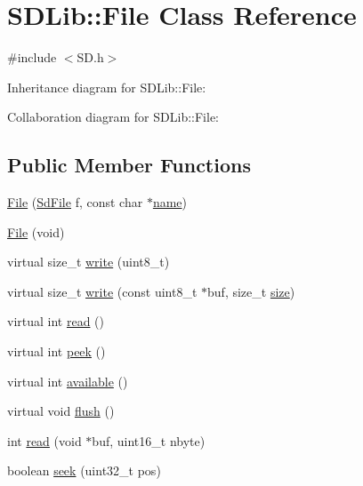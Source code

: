 \hypertarget{class_s_d_lib_1_1_file}{}\section{S\+D\+Lib\+:\+:File Class Reference}
\label{class_s_d_lib_1_1_file}


{\ttfamily \#include $<$S\+D.\+h$>$}



Inheritance diagram for S\+D\+Lib\+:\+:File\+:


Collaboration diagram for S\+D\+Lib\+:\+:File\+:
\subsection*{Public Member Functions}
\begin{DoxyCompactItemize}
\item 
\hyperlink{class_s_d_lib_1_1_file_ad34490d697d9e56859f566534b360c54}{File} (\hyperlink{class_sd_file}{Sd\+File} f, const char $\ast$\hyperlink{class_s_d_lib_1_1_file_a7dc80cb96e6062652690a42b584f230e}{name})
\item 
\hyperlink{class_s_d_lib_1_1_file_a7dcb21db9e1623e84b9c3dee81c12617}{File} (void)
\item 
virtual size\+\_\+t \hyperlink{class_s_d_lib_1_1_file_acee911dcb9057b964fd5b3ce888a934b}{write} (uint8\+\_\+t)
\item 
virtual size\+\_\+t \hyperlink{class_s_d_lib_1_1_file_aa531c1641a2363e1f6b9d103f37433da}{write} (const uint8\+\_\+t $\ast$buf, size\+\_\+t \hyperlink{class_s_d_lib_1_1_file_a603d3cd3319142d00a7ebd434970b017}{size})
\item 
virtual int \hyperlink{class_s_d_lib_1_1_file_a4c46a1975e66c37977bf07c58ec10b4e}{read} ()
\item 
virtual int \hyperlink{class_s_d_lib_1_1_file_a0e5025f39bd584563bfe4b05fc1db268}{peek} ()
\item 
virtual int \hyperlink{class_s_d_lib_1_1_file_acf613c4e75bae85f543b30e701ebcc44}{available} ()
\item 
virtual void \hyperlink{class_s_d_lib_1_1_file_af87fa862de707575b8badd044a5af80e}{flush} ()
\item 
int \hyperlink{class_s_d_lib_1_1_file_a30539792f063f24ee5ee7c11dfa564b2}{read} (void $\ast$buf, uint16\+\_\+t nbyte)
\item 
boolean \hyperlink{class_s_d_lib_1_1_file_a2a46cc148ddc53fe5170164227a695ae}{seek} (uint32\+\_\+t pos)
\item 

\end{DoxyCompactItemize}
